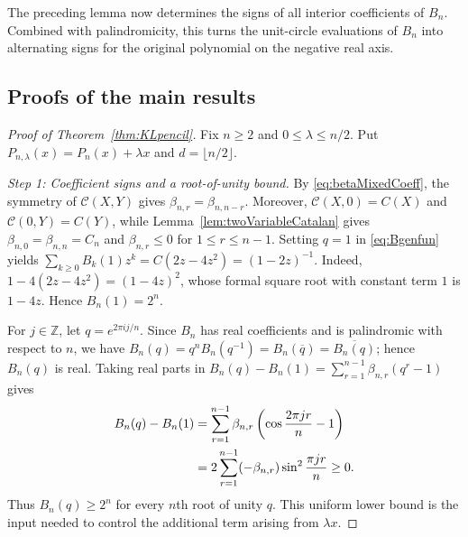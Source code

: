 \documentclass[11pt]{article}
\theoremstyle{plain}
\theoremstyle{remark}
\begin{document}
The preceding lemma now determines the signs of all interior
coefficients of $B_n$.  Combined with palindromicity, this turns the
unit-circle evaluations of $B_n$ into alternating signs for the
original polynomial on the negative real axis.

\subsection{Proofs of the main results}

\begin{proof}[Proof of Theorem~\ref{thm:KLpencil}]
Fix $n\ge2$ and $0\le\lambda\le n/2$.  Put
$P_{n,\lambda}(x)=P_n(x)+\lambda x$ and
$d=\lfloor n/2\rfloor$.

\medskip
\noindent\emph{Step 1: Coefficient signs and a root-of-unity bound.}
By \eqref{eq:betaMixedCoeff}, the symmetry of $\mathcal C(X,Y)$ gives
$\beta_{n,r}=\beta_{n,n-r}$.  Moreover,
$\mathcal C(X,0)=C(X)$ and $\mathcal C(0,Y)=C(Y)$, while
Lemma~\ref{lem:twoVariableCatalan} gives
$\beta_{n,0}=\beta_{n,n}=C_n$ and
$\beta_{n,r}\le0$ for $1\le r\le n-1$.
Setting $q=1$ in \eqref{eq:Bgenfun} yields
$\sum_{k\ge0}B_k(1)z^k=C(2z-4z^2)=(1-2z)^{-1}$.  Indeed,
$1-4(2z-4z^2)=(1-4z)^2$, whose formal square root with constant
term $1$ is $1-4z$.  Hence
$B_n(1)=2^n$.

For $j\in\mathbb Z$, let $q=e^{2\pi ij/n}$.  Since $B_n$ has real
coefficients and is palindromic with respect to $n$, we have
$B_n(q)=q^nB_n(q^{-1})=B_n(\overline q)=\overline{B_n(q)}$; hence
$B_n(q)$ is real.  Taking real parts in
$B_n(q)-B_n(1)=\sum_{r=1}^{n-1}\beta_{n,r}(q^r-1)$ gives
\begin{align}
B_n(q)-B_n(1)
&=\sum_{r=1}^{n-1}\beta_{n,r}
\left(\cos\frac{2\pi jr}{n}-1\right) \notag\\
&=2\sum_{r=1}^{n-1}(-\beta_{n,r})
\sin^2\frac{\pi jr}{n}\ge0.
\label{eq:BnRootUnityBound}
\end{align}
Thus $B_n(q)\ge2^n$ for every $n$th root of unity $q$.  This
uniform lower bound is the input needed to control the additional
term arising from $\lambda x$.


\end{proof}
\end{document}

